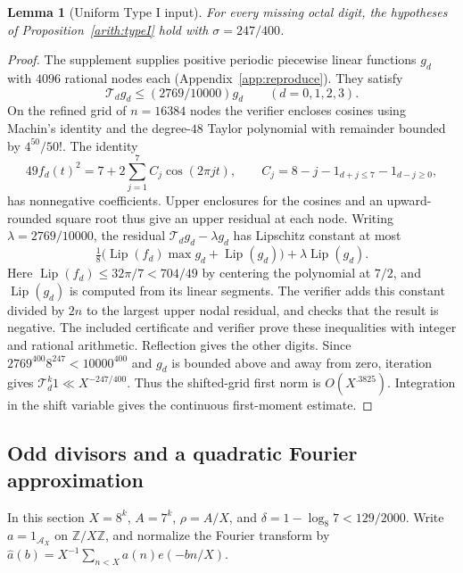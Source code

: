 \documentclass[11pt,a4paper]{article}
\theoremstyle{paperplain}
\newtheorem{lemma}[theorem]{Lemma}
\numberwithin{equation}{section}
\begin{document}
\begin{lemma}[Uniform Type I input]\label{octal:uniformTypeI}
For every missing octal digit, the hypotheses of Proposition~\ref{arith:typeI}
hold with $\sigma=247/400$.
\end{lemma}
\begin{proof}
The supplement supplies positive periodic piecewise linear functions
$g_d$ with $4096$ rational nodes each (Appendix~\ref{app:reproduce}).
They satisfy
\[
\mathcal T_dg_d\le (2769/10000)g_d\qquad (d=0,1,2,3).
\]
On the refined grid of $n=16384$ nodes the verifier encloses cosines
using Machin's identity and the degree-$48$ Taylor polynomial with
remainder bounded by $4^{50}/50!$. The identity
\[
 49 f_d(t)^2=7+2\sum_{j=1}^7 C_j\cos(2\pi jt),\qquad
 C_j=8-j-1_{d+j\le 7}-1_{d-j\ge0},
\]
has nonnegative coefficients. Upper enclosures for the cosines and an
upward-rounded square root thus give an upper residual at each node.
Writing $\lambda=2769/10000$, the residual
$\mathcal T_d g_d-\lambda g_d$ has Lipschitz constant at most
\[
 \tfrac18\big(\operatorname{Lip}(f_d)\max g_d+\operatorname{Lip}(g_d)\big)
       +\lambda\operatorname{Lip}(g_d).
\]
Here $\operatorname{Lip}(f_d)\le 32\pi/7<704/49$ by centering the
polynomial at $7/2$, and $\operatorname{Lip}(g_d)$ is computed from its
linear segments. The verifier adds this constant divided by $2n$ to
the largest upper nodal residual, and checks that the result is negative.
The included certificate and verifier prove these inequalities with
integer and rational arithmetic. Reflection gives the other digits.
Since $2769^{400}8^{247}<10000^{400}$ and $g_d$ is bounded above and away
from zero, iteration gives $\mathcal T_d^k1\ll X^{-247/400}$.
Thus the shifted-grid first norm is $O(X^{.3825})$. Integration in
the shift variable gives the continuous first-moment estimate.
\end{proof}


\subsection{Odd divisors and a quadratic Fourier approximation}
\label{sec:projection-typeI}

In this section $X=8^k$, $A=7^k$, $\rho=A/X$, and
$\delta=1-\log_8 7<129/2000$. Write $a=1_{\mathcal A_X}$ on
$\mathbb Z/X\mathbb Z$, and normalize the Fourier transform by
$\widehat a(b)=X^{-1}\sum_{n<X}a(n)e(-bn/X)$.
\end{document}
